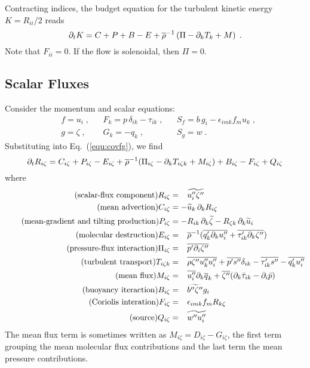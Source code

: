Contracting indices, the budget equation for the turbulent kinetic energy $K=R_{ii}/2$ reads
\begin{equation}
  \pt{K}{t} = C +P +B -E +\avr{\rho}^{-1} \left( \Pi -\pt{T_k}{k} +M \right)\;.
\end{equation}
Note that $F_{ii}=0$. If the flow is solenoidal, then $\Pi=0$.

\subsection{Scalar Fluxes}

Consider the momentum and scalar equations:
\begin{align}
  &f = u_i\;,   && F_k =p\,\delta_{ik}-\tau_{ik}\;,  && S_f = b\, g_i- \epsilon_{imk} f_m u_k\;,\\
  &g = \zeta\;, && G_k =-q_{k}\;,                    && S_g = w\;.
\end{align}
Substituting into Eq.~(\ref{equ:covfg}), we find
\begin{equation}\label{equ:Ris}
  \pt{R_{i \zeta}}{t}= C_{i\zeta} +P_{i\zeta} -E_{i\zeta}
  +\avr{\rho}^{-1} ( \Pi_{i\zeta} -\pt{T_{i\zeta k}}{k} +M_{i\zeta} ) +B_{i\zeta} -F_{i\zeta} +Q_{i\zeta}
\end{equation}
where
\begin{align}
  \tag{scalar-flux component}
    R_{i\zeta}    &=\phantom{-} \avf{u_i''\zeta''} \\
  \tag{mean advection}
    C_{i\zeta}    &=-\avf{u}_k\,\pt{R_{i\zeta}}{k} \\
  \tag{mean-gradient and tilting production}
    P_{i\zeta}    &=-R_{ik}\,\pt{\avf{\zeta}}{k} -R_{\zeta k}\,\pt{\avf{u}_i}{k} \\
  \tag{molecular destruction}
    E_{i\zeta} &=\phantom{-} \avr{\rho}^{-1} ( \avr{q_k'\pt{u_i''}{k}}
                                              +\avr{\tau_{ik}' \pt{\zeta''}{k}} ) \\
  \tag{pressure-flux interaction}
    \Pi_{i\zeta}  &=\phantom{-} \avr{p'\pt{\zeta''}{i}}\\
  \tag{\text{turbulent transport}}
    T_{i\zeta k}  &=\phantom{-} \avr{\rho \zeta''u''_ku''_i } +\avr{p's''}\delta_{ik}
                               -\avr{\tau'_{ik}s''}-\avr{q_k'u_i''}\\
  \tag{mean flux}
    M_{i\zeta}    &=\phantom{-} \avr{u''_i}\pt{\avr{q}_k}{k}
                               +\avr{\zeta''} ( \pt{\bar{\tau}_{ik}}{k} -\pt{\bar{p}}{i} ) \\
  \tag{buoyancy iteraction}
    B_{i\zeta}    &=\phantom{-} \avf{b''\zeta''}g_i \\
  \tag{Coriolis interation}
    F_{i\zeta}    &=\phantom{-} \epsilon_{imk} f_m R_{k\zeta} \\
  \tag{source}
    Q_{i\zeta}    &=\phantom{-} \avf{w''u_i''}
\end{align}
The mean flux term is sometimes written as $M_{i\zeta}=D_{i\zeta}-G_{i\zeta}$, the first term grouping the mean molecular flux contributions and the last term the mean pressure contributions.

